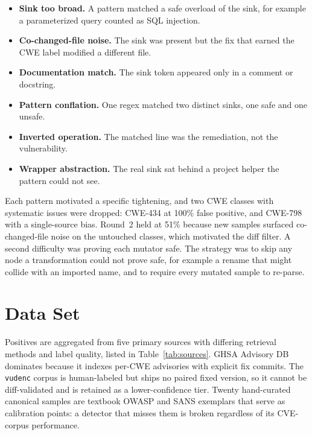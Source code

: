 \begin{itemize}
  \item \textbf{Sink too broad.} A pattern matched a safe overload of the sink,
    for example a parameterized query counted as SQL injection.
  \item \textbf{Co-changed-file noise.} The sink was present but the fix that
    earned the CWE label modified a different file.
  \item \textbf{Documentation match.} The sink token appeared only in a comment
    or docstring.
  \item \textbf{Pattern conflation.} One regex matched two distinct sinks, one
    safe and one unsafe.
  \item \textbf{Inverted operation.} The matched line was the remediation, not
    the vulnerability.
  \item \textbf{Wrapper abstraction.} The real sink sat behind a project helper
    the pattern could not see.
\end{itemize}

Each pattern motivated a specific tightening, and two CWE classes with systematic
issues were dropped: CWE-434 at 100\% false positive, and CWE-798 with a
single-source bias. Round~2 held at 51\% because new samples surfaced
co-changed-file noise on the untouched classes, which motivated the diff filter.
A second difficulty was proving each mutator safe. The strategy was to skip any
node a transformation could not prove safe, for example a rename that might
collide with an imported name, and to require every mutated sample to re-parse.

\section{Data Set}

Positives are aggregated from five primary sources with differing retrieval
methods and label quality, listed in Table~\ref{tab:sources}. GHSA Advisory DB
dominates because it indexes per-CWE advisories with explicit fix commits. The
\texttt{vudenc} corpus is human-labeled but ships no paired fixed version, so it
cannot be diff-validated and is retained as a lower-confidence tier. Twenty
hand-curated canonical samples are textbook OWASP and SANS exemplars that serve
as calibration points: a detector that misses them is broken regardless of its
CVE-corpus performance.

